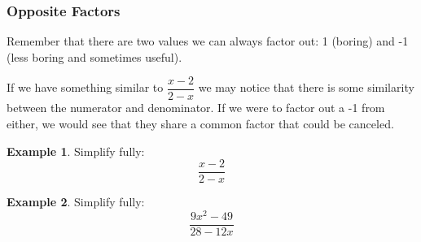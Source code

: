 \documentclass[addpoints,12pt]{exam}
\theoremstyle{definition}
\newtheorem{example}{Example}[subsection]
\begin{document}
\newpage

\subsubsection*{Opposite Factors}
\noindent Remember that there are two values we can always factor out: 1 (boring) and -1 (less boring and sometimes useful).

\noindent If we have something similar to $\dfrac{x-2}{2-x}$ we may notice that there is some similarity between the numerator and denominator. If we were to factor out a -1 from either, we would see that they share a common factor that could be canceled.

\vspace{.25in}

\begin{example}
Simplify fully: \[\dfrac{x-2}{2-x}\]
\vspace{1.5in}
\end{example}

\begin{example}
Simplify fully: \[\dfrac{9x^2-49}{28-12x}\]
\end{example}
\end{document}
